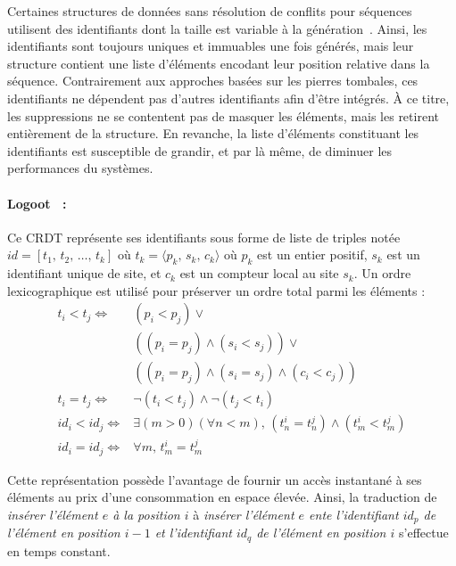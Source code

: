 Certaines structures de données sans résolution de conflits pour séquences
utilisent des identifiants dont la taille est variable à la
génération~\cite{andre2013supporting, preguica2009commutative,
  weiss2009logoot}. Ainsi, les identifiants sont toujours uniques et immuables
une fois générés, mais leur structure contient une liste d'éléments encodant
leur position relative dans la séquence.  Contrairement aux approches basées sur
les pierres tombales, ces identifiants ne dépendent pas d'autres identifiants
afin d'être intégrés. À ce titre, les suppressions ne se contentent pas de
masquer les éléments, mais les retirent entièrement de la structure. En
revanche, la liste d'éléments constituant les identifiants est susceptible de
grandir, et par là même, de diminuer les performances du systèmes.

\paragraph{Logoot~\cite{weiss2010collaborative, weiss2009logoot,
    weiss2010logootundo} :} Ce CRDT représente ses identifiants sous forme de
liste de triples notée $id = [t_1,\,t_2,\,\ldots,\,t_k]$ où
$t_k=\langle p_k,\,s_k,\,c_k \rangle$ où $p_k$ est un entier positif, $s_k$ est
un identifiant unique de site, et $c_k$ est un compteur local au site $s_k$. Un
ordre lexicographique est utilisé pour préserver un ordre total parmi les
éléments : 
\begin{align*}
  t_i < t_j \iff & (p_i < p_j) \vee \\
                 & ((p_i = p_j) \wedge (s_i<s_j)) \vee \\
                 & ((p_i = p_j) \wedge (s_i = s_j) \wedge (c_i < c_j)) \\
  t_i = t_j \iff & \neg (t_i < t_j) \wedge \neg (t_j < t_i) \\
  id_i < id_j \iff & \exists (m > 0)(\forall n < m),\, (t^i_n = t^j_n) \wedge (t^i_m < t^j_m) \\
  id_i = id_j \iff & \forall m,\, t^i_m = t^j_m
\end{align*}



Cette représentation possède l'avantage de fournir un accès instantané à ses
éléments au prix d'une consommation en espace élevée. Ainsi, la traduction de
\emph{insérer l'élément $e$ à la position $i$} à \emph{insérer l'élément $e$
  ente l'identifiant $id_p$ de l'élément en position $i-1$ et l'identifiant
  $id_q$ de l'élément en position $i$} s'effectue en temps constant.

